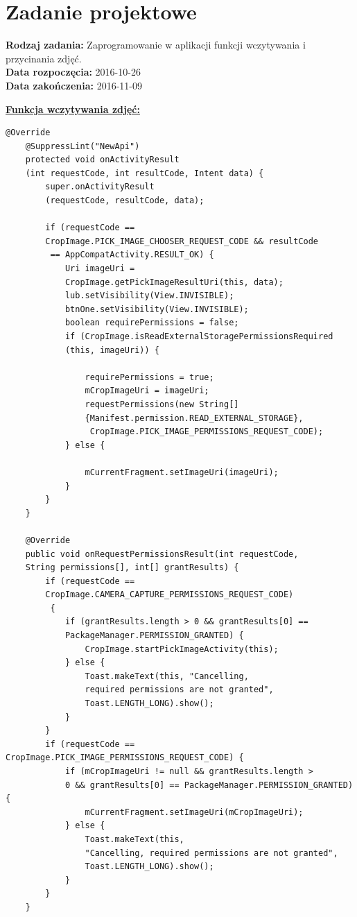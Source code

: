 \section{Zadanie projektowe}
\noindent\textbf{Rodzaj zadania:}  Zaprogramowanie w aplikacji funkcji wczytywania i przycinania zdjęć.\\

\noindent\textbf{Data rozpoczęcia:} 2016-10-26\\

\noindent\textbf{Data zakończenia:} 2016-11-09\\

\begin{center}
\underline{\textbf{Funkcja wczytywania zdjęć:}}
\end{center}

\begin{verbatim}
@Override
    @SuppressLint("NewApi")
    protected void onActivityResult
    (int requestCode, int resultCode, Intent data) {
        super.onActivityResult
        (requestCode, resultCode, data);

        if (requestCode == 
        CropImage.PICK_IMAGE_CHOOSER_REQUEST_CODE && resultCode
         == AppCompatActivity.RESULT_OK) {
            Uri imageUri = 
            CropImage.getPickImageResultUri(this, data);
            lub.setVisibility(View.INVISIBLE);
            btnOne.setVisibility(View.INVISIBLE);
            boolean requirePermissions = false;
            if (CropImage.isReadExternalStoragePermissionsRequired
            (this, imageUri)) {

                requirePermissions = true;
                mCropImageUri = imageUri;
                requestPermissions(new String[]
                {Manifest.permission.READ_EXTERNAL_STORAGE},
                 CropImage.PICK_IMAGE_PERMISSIONS_REQUEST_CODE);
            } else {

                mCurrentFragment.setImageUri(imageUri);
            }
        }
    }

    @Override
    public void onRequestPermissionsResult(int requestCode, 
    String permissions[], int[] grantResults) {
        if (requestCode == 
        CropImage.CAMERA_CAPTURE_PERMISSIONS_REQUEST_CODE)
         {
            if (grantResults.length > 0 && grantResults[0] == 
            PackageManager.PERMISSION_GRANTED) {
                CropImage.startPickImageActivity(this);
            } else {
                Toast.makeText(this, "Cancelling, 
                required permissions are not granted", 
                Toast.LENGTH_LONG).show();
            }
        }
        if (requestCode == CropImage.PICK_IMAGE_PERMISSIONS_REQUEST_CODE) {
            if (mCropImageUri != null && grantResults.length > 
            0 && grantResults[0] == PackageManager.PERMISSION_GRANTED) {
                mCurrentFragment.setImageUri(mCropImageUri);
            } else {
                Toast.makeText(this, 
                "Cancelling, required permissions are not granted", 
                Toast.LENGTH_LONG).show();
            }
        }
    }
\end{verbatim}
